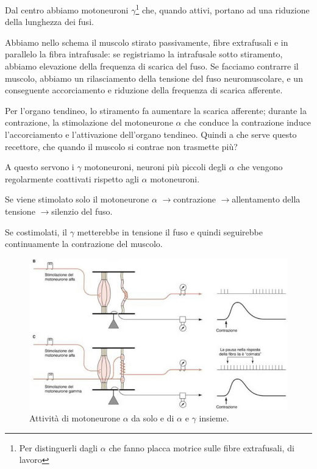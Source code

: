 \documentclass[a4paper,12pt]{article}
\newcommand{\lfreccia}{\ensuremath{\longrightarrow}}
\begin{document}
Dal centro abbiamo motoneuroni $\gamma$\footnote{Per distinguerli dagli $\alpha$ che fanno placca motrice sulle fibre extrafusali, di lavoro} che, quando attivi, portano ad una riduzione della lunghezza dei fusi.

Abbiamo nello schema il muscolo stirato passivamente, fibre extrafusali e in parallelo la fibra intrafusale: se registriamo la intrafusale sotto stiramento, abbiamo elevazione della frequenza di scarica del fuso. Se facciamo contrarre il muscolo, abbiamo un rilasciamento della tensione del fuso neuromuscolare, e un conseguente accorciamento e riduzione della frequenza di scarica afferente.

Per l'organo tendineo, lo stiramento fa aumentare la scarica afferente; durante la contrazione, la stimolazione del motoneurone $\alpha$ che conduce la contrazione induce l'accorciamento e l'attivazione dell'organo tendineo.
Quindi a che serve questo recettore, che quando il muscolo si contrae non trasmette più?

A questo servono i $\gamma$ motoneuroni, neuroni più piccoli degli $\alpha$ che vengono regolarmente coattivati rispetto agli $\alpha$ motoneuroni. 

Se viene stimolato solo il motoneurone $\alpha$ \lfreccia contrazione \lfreccia allentamento della tensione \lfreccia silenzio del fuso.

Se costimolati, il $\gamma$ metterebbe in tensione il fuso e quindi seguirebbe continuamente la contrazione del muscolo. 

\begin{figure}[H]
\centering
\includegraphics[scale=0.4]{immagine/gammaalfa.jpg}
\caption{Attività di motoneurone $\alpha$ da solo e di $\alpha$ e $\gamma$ insieme.}
\end{figure}
\end{document}
